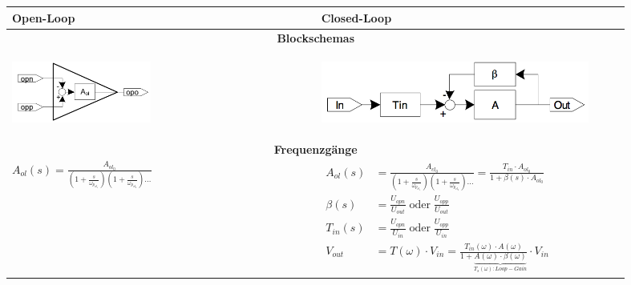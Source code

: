 \begin{tabular}{|p{0.45\linewidth}|p{0.45\linewidth}|}
	\hline
	\textbf{Open-Loop}
		& \textbf{Closed-Loop}\\
	\hline
	\multicolumn{2}{|c|}{\textbf{Blockschemas}}\\
	\hline
    \vspace{-7mm}
	\begin{center}
	 	\includegraphics[height=2cm, valign=t]{./pictures/opAmpOL.png}
	\end{center}
		& \vspace{-7mm}
          \begin{center}
			\includegraphics[height=2cm, valign=t]{./pictures/opAmpCL.png}
		  \end{center}\\
	\hline
	\multicolumn{2}{|c|}{\textbf{Frequenzgänge}}\\
	\hline
	\large{$A_{ol}(s)=\frac{A_{ol_0}}{(1+\frac{s}{\omega_{p_{ol_1}}})(1+\frac{s}{\omega_{p_{ol_2}}})\dots}$}
	& $\begin{aligned}
        A_{ol}(s) &= \frac{A_{cl_0}}{(1+\frac{s}{\omega_{p_{cl_1}}})(1+\frac{s}{\omega_{p_{cl_2}}})\dots} = \frac{T_{in}\cdot A_{ol_0}}{1+\beta(s)\cdot A_{ol_0}}\\
		\beta(s) &= \frac{U_{opn}}{U_{out}}\;\text{oder}\;\frac{U_{opp}}{U_{out}}\\
		T_{in}(s) &= \frac{U_{opn}}{U_{in}}\;\text{oder}\;\frac{U_{opp}}{U_{in}}\\
        V_{out} &= T(\omega)\cdot V_{in} = \frac{T_{in}(\omega)\cdot A(\omega)}{1 + \underbrace{A(\omega)\cdot \beta(\omega)}_{T_s(\omega):Loop-Gain}} \cdot V_{in}
	   \end{aligned}$\\
	\hline
\end{tabular}
\\ \\
